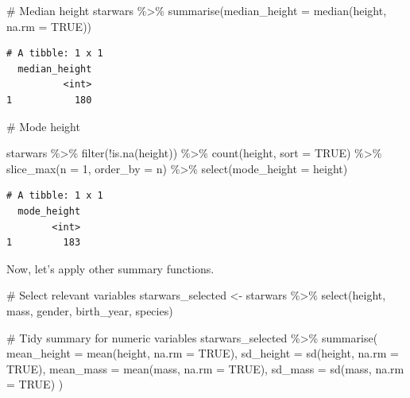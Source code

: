 \documentclass[
  man,
  floatsintext,
  longtable,
  nolmodern,
  notxfonts,
  notimes,
  colorlinks=true,linkcolor=blue,citecolor=blue,urlcolor=blue]{apa7}
\newenvironment{Shaded}{\begin{snugshade}}{\end{snugshade}}
\newcommand{\AttributeTok}[1]{\textcolor[rgb]{0.40,0.45,0.13}{#1}}
\newcommand{\CommentTok}[1]{\textcolor[rgb]{0.37,0.37,0.37}{#1}}
\newcommand{\ConstantTok}[1]{\textcolor[rgb]{0.56,0.35,0.01}{#1}}
\newcommand{\DecValTok}[1]{\textcolor[rgb]{0.68,0.00,0.00}{#1}}
\newcommand{\FunctionTok}[1]{\textcolor[rgb]{0.28,0.35,0.67}{#1}}
\newcommand{\NormalTok}[1]{\textcolor[rgb]{0.00,0.23,0.31}{#1}}
\newcommand{\OtherTok}[1]{\textcolor[rgb]{0.00,0.23,0.31}{#1}}
\newcommand{\SpecialCharTok}[1]{\textcolor[rgb]{0.37,0.37,0.37}{#1}}
\begin{document}
\begin{Shaded}
\begin{Highlighting}[]
\CommentTok{\# Median height}
\NormalTok{starwars }\SpecialCharTok{\%\textgreater{}\%} 
  \FunctionTok{summarise}\NormalTok{(}\AttributeTok{median\_height =} \FunctionTok{median}\NormalTok{(height, }\AttributeTok{na.rm =} \ConstantTok{TRUE}\NormalTok{))}
\end{Highlighting}
\end{Shaded}

\begin{verbatim}
# A tibble: 1 x 1
  median_height
          <int>
1           180
\end{verbatim}

\begin{Shaded}
\begin{Highlighting}[]
\CommentTok{\# Mode height}

\NormalTok{starwars }\SpecialCharTok{\%\textgreater{}\%}
  \FunctionTok{filter}\NormalTok{(}\SpecialCharTok{!}\FunctionTok{is.na}\NormalTok{(height)) }\SpecialCharTok{\%\textgreater{}\%}
  \FunctionTok{count}\NormalTok{(height, }\AttributeTok{sort =} \ConstantTok{TRUE}\NormalTok{) }\SpecialCharTok{\%\textgreater{}\%}
  \FunctionTok{slice\_max}\NormalTok{(}\AttributeTok{n =} \DecValTok{1}\NormalTok{, }\AttributeTok{order\_by =}\NormalTok{ n) }\SpecialCharTok{\%\textgreater{}\%}
  \FunctionTok{select}\NormalTok{(}\AttributeTok{mode\_height =}\NormalTok{ height)}
\end{Highlighting}
\end{Shaded}

\begin{verbatim}
# A tibble: 1 x 1
  mode_height
        <int>
1         183
\end{verbatim}

Now, let's apply other summary functions.

\begin{Shaded}
\begin{Highlighting}[]
\CommentTok{\# Select relevant variables}
\NormalTok{starwars\_selected }\OtherTok{\textless{}{-}}\NormalTok{ starwars }\SpecialCharTok{\%\textgreater{}\%}
  \FunctionTok{select}\NormalTok{(height, mass, gender, birth\_year, species)}

\CommentTok{\# Tidy summary for numeric variables}
\NormalTok{starwars\_selected }\SpecialCharTok{\%\textgreater{}\%}
  \FunctionTok{summarise}\NormalTok{(}
    \AttributeTok{mean\_height =} \FunctionTok{mean}\NormalTok{(height, }\AttributeTok{na.rm =} \ConstantTok{TRUE}\NormalTok{),}
    \AttributeTok{sd\_height =} \FunctionTok{sd}\NormalTok{(height, }\AttributeTok{na.rm =} \ConstantTok{TRUE}\NormalTok{),}
    \AttributeTok{mean\_mass =} \FunctionTok{mean}\NormalTok{(mass, }\AttributeTok{na.rm =} \ConstantTok{TRUE}\NormalTok{),}
    \AttributeTok{sd\_mass =} \FunctionTok{sd}\NormalTok{(mass, }\AttributeTok{na.rm =} \ConstantTok{TRUE}\NormalTok{)}
\NormalTok{  )}
\end{Highlighting}
\end{Shaded}
\end{document}
